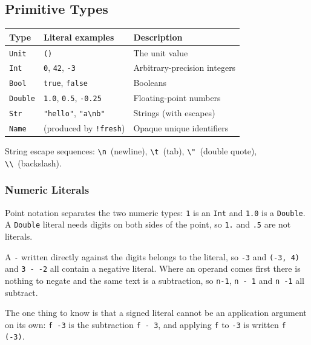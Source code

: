 \documentclass[11pt,a4paper]{article}
\newcommand{\cba}[1]{\lstinline[style=cbainline]{#1}}
\begin{document}
\subsection{Primitive Types}

\begin{center}
\begin{tabular}{lll}
\toprule
\textbf{Type} & \textbf{Literal examples} & \textbf{Description} \\
\midrule
\texttt{Unit}   & \cba{()}                    & The unit value \\
\texttt{Int}    & \texttt{0}, \texttt{42}, \texttt{-3}  & Arbitrary-precision integers \\
\texttt{Bool}   & \cba{true}, \cba{false}     & Booleans \\
\texttt{Double} & \texttt{1.0}, \texttt{0.5}, \texttt{-0.25} & Floating-point numbers \\
\texttt{Str}    & \texttt{"hello"}, \texttt{"a\textbackslash nb"} & Strings (with escapes) \\
\texttt{Name} & (produced by \cba{!fresh}) & Opaque unique identifiers \\
\bottomrule
\end{tabular}
\end{center}

String escape sequences: \texttt{\textbackslash n}~(newline),
\texttt{\textbackslash t}~(tab), \texttt{\textbackslash"}~(double quote),
\texttt{\textbackslash\textbackslash}~(backslash).

\subsubsection*{Numeric Literals}

Point notation separates the two numeric types: \texttt{1} is an \texttt{Int}
and \texttt{1.0} is a \texttt{Double}.  A \texttt{Double} literal needs digits
on both sides of the point, so \texttt{1.} and \texttt{.5} are not literals.

A \texttt{-} written directly against the digits belongs to the literal, so
\texttt{-3} and \texttt{(-3, 4)} and \texttt{3 - -2} all contain a negative
literal.  Where an operand comes first there is nothing to negate and the
same text is a subtraction, so \texttt{n-1}, \texttt{n - 1} and \texttt{n -1}
all subtract.

The one thing to know is that a signed literal cannot be an application
argument on its own: \cba{f -3} is the subtraction \cba{f - 3}, and applying
\texttt{f} to \texttt{-3} is written \cba{f (-3)}.
\end{document}
